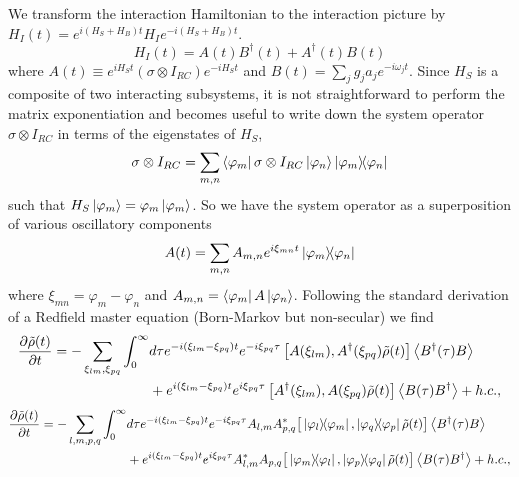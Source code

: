 \documentclass[]{article}
\begin{document}
We transform the interaction Hamiltonian to the interaction picture by $H_I(t) = e^{i(H_S+H_B) t}H_I e^{-i (H_S+H_B)t}$.
\begin{equation}
\label{eq:IDecomposition}
H_I(t) = A(t) B^{\dagger}(t) + A^{\dagger}(t) B(t)  
\end{equation}
where $A(t) \equiv e^{iH_S t}(\sigma\otimes I_{RC})e^{-i H_S t}$ and $B(t)= \sum_{j}g_ja_je^{-i\omega_j t}$. Since $H_S$ is a composite of two interacting subsystems, it is not straightforward to perform the matrix exponentiation and becomes useful to write down the system operator $\sigma\otimes I_{RC}$ in terms of the eigenstates of $H_S$,
\begin{equation}
\sigma\otimes I_{RC} = \sum_{m,n} \bra{\varphi_m}\sigma\otimes I_{RC}\ket{\varphi_n}\dyad{\varphi_m}{\varphi_n}
\end{equation}
such that $H_S\ket{\varphi_m}=\varphi_m\ket{\varphi_m}$. So we have the system operator as a superposition of various oscillatory components
\begin{equation}
A(t) = \sum_{m,n} A_{m,n} e^{i\xi_{mn}t}\dyad{\varphi_m}{\varphi_n}
\end{equation}
where $\xi_{mn} = \varphi_m - \varphi_n$ and $A_{m,n} = \bra{\varphi_m}A\ket{\varphi_n}$.
Following the standard derivation of a Redfield master equation (Born-Markov but non-secular) we find
\begin{align}
	\begin{split}
		\pdv{\tilde{\rho}(t)}{t} = - \sum_{\xi_{lm}, \xi_{pq}}\int_{0}^{\infty}& d\tau e^{-i(\xi_{lm}-\xi_{pq})t} e^{-i\xi_{pq}\tau} \left[A(\xi_{lm}), A^{\dagger}(\xi_{pq})\tilde{\rho}(t)\right] \expval{B^{\dagger}(\tau)B} \\
		&+ e^{i(\xi_{lm}-\xi_{pq})t} e^{i\xi_{pq}\tau} \left[A^{\dagger}(\xi_{lm}), A(\xi_{pq})\tilde{\rho}(t)\right] \expval{B(\tau)B^{\dagger}} + h.c.,
	\end{split}
\end{align}
\begin{align}
	\begin{split}
		\pdv{\tilde{\rho}(t)}{t} = - \sum_{l,m,p,q}\int_{0}^{\infty}& d\tau e^{-i(\xi_{lm}-\xi_{pq})t} e^{-i\xi_{pq}\tau} A_{l,m}A_{p,q}^{*}\big[\dyad{\varphi_l}{\varphi_m}, \dyad{\varphi_q}{\varphi_p}\tilde{\rho}(t)\big] \expval{B^{\dagger}(\tau)B} \\
		&+ e^{i(\xi_{lm}-\xi_{pq})t} e^{i\xi_{pq}\tau} A_{l,m}^{*}A_{p,q}\big[\dyad{\varphi_m}{\varphi_l}, \dyad{\varphi_p}{\varphi_q}\tilde{\rho}(t)\big] \expval{B(\tau)B^{\dagger}} + h.c.,
	\end{split}
\end{align}
\end{document}
